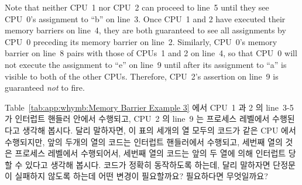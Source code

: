 Note that neither CPU~1 nor CPU~2 can proceed to line~5 until they see
CPU~0's assignment to ``b'' on line~3.
Once CPU~1 and 2 have executed their memory barriers on line~4, they
are both guaranteed to see all assignments by CPU~0 preceding its memory
barrier on line~2.
Similarly, CPU~0's memory barrier on line~8 pairs with those of CPUs~1 and 2
on line~4, so that CPU~0 will not execute the assignment to ``e'' on
line~9 until after its assignment to ``a'' is visible to both of the
other CPUs.
Therefore, CPU~2's assertion on line~9 is guaranteed \emph{not} to fire.
\fi

\QuickQuiz{}
	Table~\ref{tab:app:whymb:Memory Barrier Example 3} 에서 CPU~1 과 2 의
	line~3-5 가 인터럽트 핸들러 안에서 수행되고, CPU~2 의 line~9 는
	프로세스 레벨에서 수행된다고 생각해 봅시다.
	달리 말하자면, 이 표의 세개의 열 모두의 코드가 같은 CPU 에서
	수행되지만, 앞의 두개의 열의 코드는 인터럽트 핸들러에서 수행되고,
	세번째 열의 것은 프로세스 레벨에서 수행되어서, 세번째 열의 코드는 앞의
	두 열에 의해 인터럽트 당할 수 있다고 생각해 봅시다.
	코드가 정확히 동작하도록 하는데, 달리 말하자면 단정문이 실패하지 않도록
	하는데 어떤 변경이 필요할까요? 필요하다면 무엇일까요?
	\iffalse

